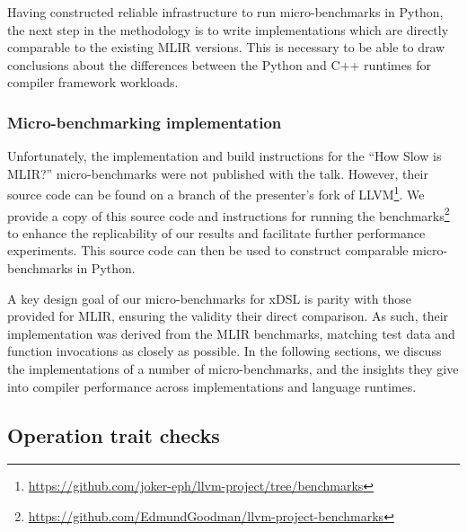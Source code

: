 Having constructed reliable infrastructure to run micro-benchmarks in Python, the next step in the methodology is to write implementations which are directly comparable to the existing MLIR versions. This is necessary to be able to draw conclusions about the differences between the Python and C++ runtimes for compiler framework workloads.


\subsubsection{Micro-benchmarking implementation}
\label{sssec:ubenchmark-methodology-impl}

Unfortunately, the implementation and build instructions for the ``How Slow is MLIR?'' micro-benchmarks were not published with the talk.
However, their source code can be found on a branch of the presenter's fork of LLVM\footnote{\url{https://github.com/joker-eph/llvm-project/tree/benchmarks}}. We provide a copy of this source code and instructions for running the benchmarks\footnote{\url{https://github.com/EdmundGoodman/llvm-project-benchmarks}} to enhance the replicability of our results and facilitate further performance experiments.
This source code can then be used to construct comparable micro-benchmarks in Python.

A key design goal of our micro-benchmarks for xDSL is parity with those provided for MLIR, ensuring the validity their direct comparison.
As such, their implementation was derived from the MLIR benchmarks, matching test data and function invocations as closely as possible.
In the following sections, we discuss the implementations of a number of micro-benchmarks, and the insights they give into compiler performance across implementations and language runtimes.



\subsection{Operation trait checks}
\label{ssec:ubenchmark-trait-checks}


